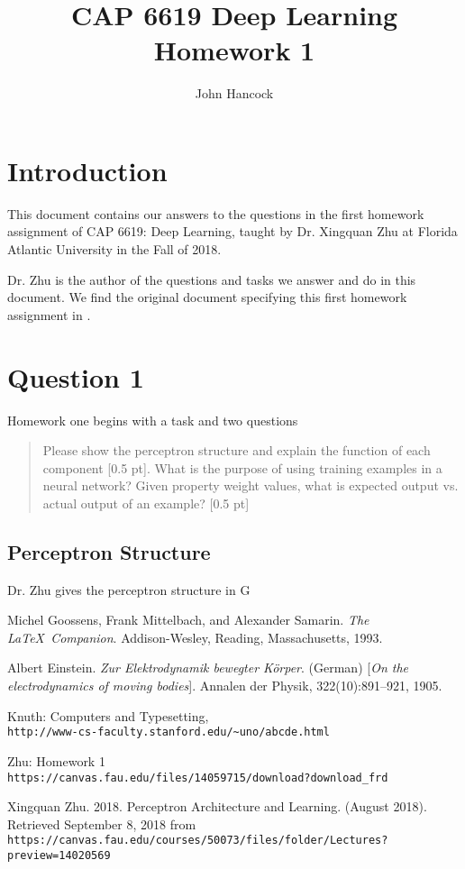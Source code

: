 \documentclass[12pt, letterpaper]{article}
\title{CAP 6619 Deep Learning Homework 1}
\author{John Hancock}
\begin{document}
\maketitle
\section{Introduction}
This document contains our answers to the questions in the first homework 
assignment of CAP 6619: Deep Learning, taught by Dr. Xingquan Zhu at Florida
Atlantic University in the Fall of 2018.

Dr. Zhu is the author of the questions and tasks we answer and do in this 
document. We find the original document specifying this first homework 
assignment in \cite{homework1}. 
\section{Question 1}
Homework one begins with a task and two questions
\begin{quote}
Please show the perceptron structure and explain the function of each component
[0.5 pt]. What is the purpose of using training examples in a neural network? Given property weight
values, what is expected output vs. actual output of an example? [0.5 pt] 
\cite{homework1}
\end{quote} 
\subsection{Perceptron Structure}
Dr. Zhu gives the perceptron structure in G
\begin{thebibliography}{9}
Michel Goossens, Frank Mittelbach, and Alexander Samarin. 
\textit{The \LaTeX\ Companion}. 
Addison-Wesley, Reading, Massachusetts, 1993.
 
Albert Einstein. 
\textit{Zur Elektrodynamik bewegter K{\"o}rper}. (German) 
[\textit{On the electrodynamics of moving bodies}]. 
Annalen der Physik, 322(10):891–921, 1905.
 
Knuth: Computers and Typesetting,
\\\texttt{http://www-cs-faculty.stanford.edu/\~{}uno/abcde.html}

Zhu: Homework 1
\\\texttt{https://canvas.fau.edu/files/14059715/download?download\_frd}

Xingquan Zhu. 2018. Perceptron Architecture and Learning. (August 2018). 
Retrieved September 8, 2018 from \\\texttt{https://canvas.fau.edu/courses/50073/files/folder/Lectures?preview=14020569}
\end{thebibliography}
\end{document}
